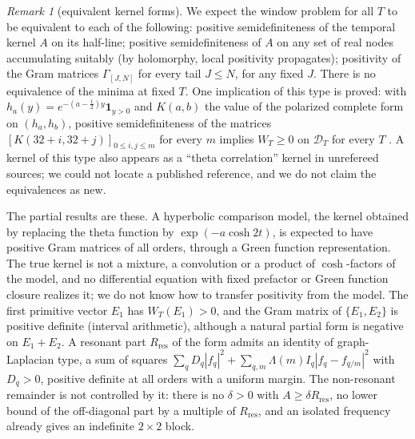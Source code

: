 \documentclass[11pt]{amsart}
\theoremstyle{definition}
\theoremstyle{remark}
\newtheorem{remark}[theorem]{Remark}
\numberwithin{equation}{section}
\newcommand{\DT}{\mathcal{D}_T}                        %
\newcommand{\WT}{W_T}                                  %
\begin{document}
\begin{remark}[equivalent kernel forms]\label{w5:obs:kernelequiv}
We expect the window problem for all $T$ to be equivalent to each of the following: positive semidefiniteness of the
temporal kernel $A$ on its half-line; positive semidefiniteness of $A$ on any set of real nodes accumulating suitably
(by holomorphy, local positivity propagates); positivity of the Gram matrices $\Gamma_{[J,N]}$ for every tail $J\le N$,
for any fixed $J$. There is no equivalence of the minima at fixed $T$. One implication of this type is proved: with
$h_a(y)=e^{-(a-\frac12)y}\mathbf 1_{y>0}$ and $K(a,b)$ the value of the polarized complete form on $(h_a,h_b)$, positive
semidefiniteness of the matrices $[K(32+i,32+j)]_{0\le i,j\le m}$ for every $m$ implies $\WT\ge0$ on $\DT$ for every $T$
\cite[Proposition~11.1]{P46}. A kernel of this type also appears as a ``theta correlation'' kernel in unrefereed
sources; we could not locate a published reference, and we do not claim the equivalences as new.
\end{remark}

The partial results are these. A hyperbolic comparison model, the kernel obtained by replacing the theta function by
$\exp(-a\cosh2t)$, is expected to have positive Gram matrices of all orders, through a Green function representation.
The true kernel is not a mixture, a convolution or a product of $\cosh$-factors of the model, and no differential
equation with fixed prefactor or Green function closure realizes it; we do not know how to transfer positivity from the
model. The first primitive vector $E_1$ has $\WT(E_1)>0$, and the Gram matrix of $\{E_1,E_2\}$ is positive definite
(interval arithmetic), although a natural partial form is negative on $E_1+E_2$. A resonant part $R_{\mathrm{res}}$ of
the form admits an identity of graph-Laplacian type, a sum of squares
$\sum_qD_q|f_q|^2+\sum_{q,m}\Lambda(m)I_q|f_q-f_{q/m}|^2$ with $D_q>0$, positive definite at all orders with a uniform
margin. The non-resonant remainder is not controlled by it: there is no $\delta>0$ with $A\ge\delta R_{\mathrm{res}}$, no
lower bound of the off-diagonal part by a multiple of $R_{\mathrm{res}}$, and an isolated frequency already gives an
indefinite $2\times2$ block.
\end{document}
